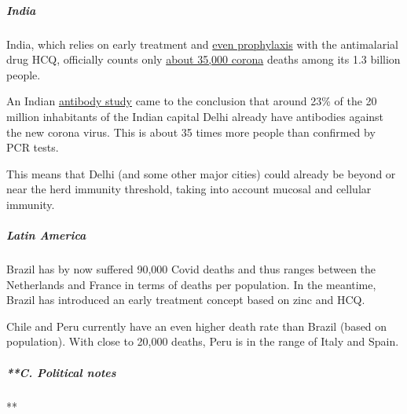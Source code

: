 \hypertarget{india}{%
\subparagraph{\texorpdfstring{\textbf{India}}{India}}\label{india}}

India, which relies on early treatment and
\href{https://health.economictimes.indiatimes.com/news/diagnostics/hcq-beneficial-as-preventive-drug-sms-doctors-told-icmr/76464620}{even
prophylaxis} with the antimalarial drug HCQ, officially counts only
\href{https://en.wikipedia.org/wiki/COVID-19_pandemic_in_India}{about
35,000 corona} deaths among its 1.3 billion people.

An Indian
\href{https://www.telegraphindia.com/india/covid-infected-and-cured-undetected-in-delhi/cid/1787002}{antibody
study} came to the conclusion that around 23\% of the 20 million
inhabitants of the Indian capital Delhi already have antibodies against
the new corona virus. This is about 35 times more people than confirmed
by PCR tests.

This means that Delhi (and some other major cities) could already be
beyond or near the herd immunity threshold, taking into account mucosal
and cellular immunity.

\hypertarget{latin-america}{%
\subparagraph{\texorpdfstring{\textbf{Latin
America}}{Latin America}}\label{latin-america}}

Brazil has by now suffered 90,000 Covid deaths and thus ranges between
the Netherlands and France in terms of deaths per population. In the
meantime, Brazil has introduced an early treatment concept based on zinc
and HCQ.

Chile and Peru currently have an even higher death rate than Brazil
(based on population). With close to 20,000 deaths, Peru is in the range
of Italy and Spain.

\hypertarget{c-political-notes}{%
\subparagraph{**C. Political notes}\label{c-political-notes}}

**

